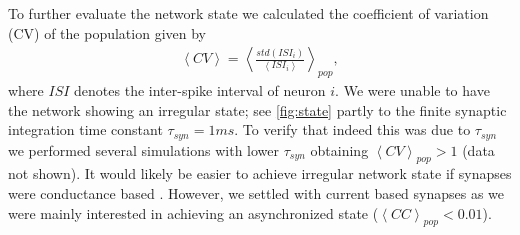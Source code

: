 \documentclass[11pt]{article}
\newcommand{\mean}[1]{\left<{#1}\right>}
\begin{document}
To further evaluate the network state we calculated the coefficient of variation (CV) of the population given by
\begin{align}
\mean{CV} = \mean{\frac{std(ISI_i)}{\mean{ISI_i}}}_{pop},
\end{align}
where $ ISI $ denotes the inter-spike interval of neuron $ i $. 
We were unable to have the network showing an irregular state; see \cref{fig:state} partly to the finite synaptic integration time constant $ \tau_{syn} = 1 ms $. To verify that indeed this was due to $ \tau_{syn} $ we performed several simulations with lower $ \tau_{syn} $ obtaining $ \mean{CV}_{pop} > 1 $ (data not shown). 
It would likely be easier to achieve irregular network state if synapses were conductance based \citep{Kumar2008}. 
However, we settled with current based synapses as we were mainly interested in achieving an asynchronized state ($ \mean{CC}_{pop} < 0.01 $).
\end{document}

